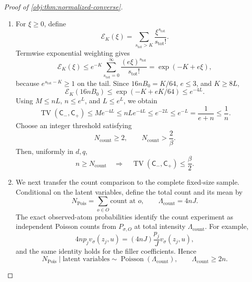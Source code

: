 \documentclass[11pt]{article}
\begin{document}
\begin{proof}[Proof of \cref{obj:thm:normalized-converse}]
\begin{enumerate}
\item
For \(\xi\ge0\), define
\[
\mathcal E_K(\xi)
=\sum_{s_{\mathrm{tot}}>K}
\frac{\xi^{s_{\mathrm{tot}}}}{s_{\mathrm{tot}}!}.
\]
Termwise exponential weighting gives
\[
\mathcal E_K(\xi)
\le e^{-K}\sum_{s_{\mathrm{tot}}=0}^{\infty}
\frac{(e\xi)^{s_{\mathrm{tot}}}}{s_{\mathrm{tot}}!}
=\exp(-K+e\xi),
\]
because \(e^{s_{\mathrm{tot}}-K}\ge1\) on the tail. Since
\(16nB_0=K/64\), \(e\le3\), and \(K\ge8L\),
\[
\mathcal E_K(16nB_0)
\le\exp(-K+eK/64)\le e^{-4L}.
\]
Using \(M\le nL\), \(n\le e^L\), and \(L\le e^L\), we obtain
\[
\operatorname{TV}(\mathsf C_-,\mathsf C_+)
\le Me^{-4L}
\le nLe^{-4L}
\le e^{-2L}
\le e^{-L}
=\frac1{e+n}
\le\frac1n.
\]
Choose an integer threshold satisfying
\[
N_{\mathrm{count}}\ge2,
\qquad
N_{\mathrm{count}}>\frac2\beta.
\]
Then, uniformly in \(d,q\),
\[
n\ge N_{\mathrm{count}}
\quad\Longrightarrow\quad
\operatorname{TV}(\mathsf C_-,\mathsf C_+)\le\frac\beta2.
\]

\item
We next transfer the count comparison to the complete fixed-size sample. Conditional on the latent variables, define the total count and its mean by
\[
N_{\mathrm{Pois}}
=\sum_{o\in O}\text{count at }o,
\qquad
\Lambda_{\mathrm{count}}=4nJ.
\]
The exact observed-atom probabilities identify the count experiment as independent Poisson counts from \(P_{\sigma,O}\) at total intensity
\(\Lambda_{\mathrm{count}}\). For example,
\[
4np_jv_\sigma(z_j,u)
=(4nJ)\frac{p_j}{J}v_\sigma(z_j,u),
\]
and the same identity holds for the filler coefficients. Hence
\[
N_{\mathrm{Pois}}\mid\text{latent variables}
\sim\operatorname{Poisson}(\Lambda_{\mathrm{count}}),
\qquad
\Lambda_{\mathrm{count}}\ge2n.
\]


\end{enumerate}
\end{proof}
\end{document}
